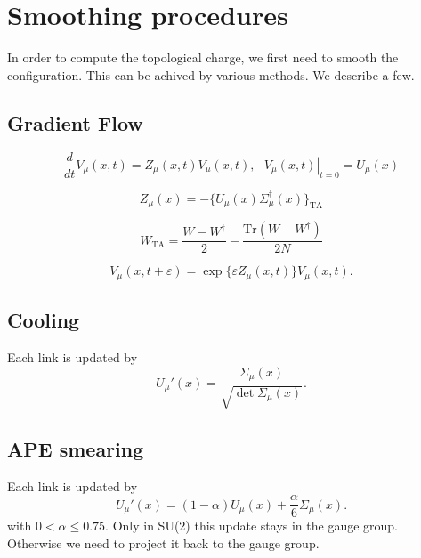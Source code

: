 \documentclass[12pt,a4paper]{article}
\begin{document}
\section{Smoothing procedures}

In order to compute the topological charge, we first need to smooth the configuration. This can be achived by various methods. We describe a few.

\subsection{Gradient Flow}
\begin{equation}
    \frac{d}{dt}V_{\mu}(x,t) = Z_{\mu}(x,t)V_{\mu}(x,t) , \ \ \  \left. {V_{\mu}(x,t)}\right|_{t = 0} = U_{\mu}(x)
\end{equation}

\begin{equation}
         Z_{\mu}(x) = -\{U_{\mu}(x)\Sigma_{\mu}^{\dagger}(x)\}_{\text{TA}}
\end{equation}

\begin{equation}
    W_{\text{TA}} = \frac{W - W^{\dagger}}{2} - \frac{\text{Tr} (W - W^{\dagger})}{2N}
\end{equation}

\begin{equation}
    V_{\mu}(x,t+\varepsilon) = \exp\{\varepsilon Z_{\mu}(x,t)\}V_{\mu}(x,t).
\end{equation}
%



\subsection{Cooling}
Each link is updated by
\begin{equation}
    U_{\mu}'(x) = \frac{\Sigma_{\mu}(x)}{\sqrt{\det \Sigma_{\mu}(x)}}.
\end{equation}
\subsection{APE smearing}
Each link is updated by 
\begin{equation}
    U_{\mu}'(x) = (1-\alpha)U_{\mu}(x)+ \frac{\alpha}{6}\Sigma_{\mu}(x).
\end{equation}
with $0<\alpha\leq 0.75$. Only in SU(2) this update stays in the gauge group. Otherwise we need to project it back to the gauge group.%
\end{document}
